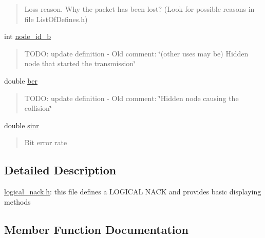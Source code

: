 \begin{DoxyCompactItemize}
\begin{DoxyCompactList}
\begin{quote}
Loss reason. Why the packet has been lost? (Look for possible reasons in file List\+Of\+Defines.\+h) \end{quote}
\end{DoxyCompactList}\item 
\mbox{\label{structLogicalNack_ac83ef69cd2771c11bfaeb63eaf3462ef}} 
int \hyperlink{structLogicalNack_ac83ef69cd2771c11bfaeb63eaf3462ef}{node\+\_\+id\+\_\+b}
\begin{DoxyCompactList}\small\item\em \begin{quote}
T\+O\+DO\+: update definition -\/ Old comment\+: \char`\"{}(other uses may be) Hidden node that started the transmission\char`\"{} \end{quote}
\end{DoxyCompactList}\item 
\mbox{\label{structLogicalNack_a29eabdbc1a240a005b2bac23a862fc05}} 
double \hyperlink{structLogicalNack_a29eabdbc1a240a005b2bac23a862fc05}{ber}
\begin{DoxyCompactList}\small\item\em \begin{quote}
T\+O\+DO\+: update definition -\/ Old comment\+: \char`\"{}\+Hidden node causing the collision\char`\"{} \end{quote}
\end{DoxyCompactList}\item 
\mbox{\label{structLogicalNack_a3c74c359e65bdd8ee0cc6cac3c6da200}} 
double \hyperlink{structLogicalNack_a3c74c359e65bdd8ee0cc6cac3c6da200}{sinr}
\begin{DoxyCompactList}\small\item\em \begin{quote}
Bit error rate \end{quote}
\end{DoxyCompactList}\end{DoxyCompactItemize}


\subsection{Detailed Description}
\hyperlink{logical__nack_8h_source}{logical\+\_\+nack.\+h}\+: this file defines a L\+O\+G\+I\+C\+AL N\+A\+CK and provides basic displaying methods 

\subsection{Member Function Documentation}
\mbox{\label{structLogicalNack_ada12234fce5b9a4fb0e519336c460fb5}} 
